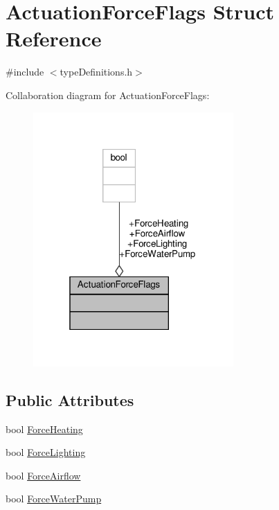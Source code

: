 \hypertarget{structActuationForceFlags}{}\section{Actuation\+Force\+Flags Struct Reference}
\label{structActuationForceFlags}


{\ttfamily \#include $<$type\+Definitions.\+h$>$}



Collaboration diagram for Actuation\+Force\+Flags\+:\nopagebreak
\begin{figure}[H]
\begin{center}
\leavevmode
\includegraphics[width=217pt]{structActuationForceFlags__coll__graph}
\end{center}
\end{figure}
\subsection*{Public Attributes}
\begin{DoxyCompactItemize}
\item 
bool \hyperlink{structActuationForceFlags_acfa5f3a1459c151992a2d783b79ea734}{Force\+Heating}
\item 
bool \hyperlink{structActuationForceFlags_a575df93310a4363147c99437d7b8061c}{Force\+Lighting}
\item 
bool \hyperlink{structActuationForceFlags_a6df34a4a82cc2b7297f8a1cbe2e073da}{Force\+Airflow}
\item 
bool \hyperlink{structActuationForceFlags_ab969137846bc6b38bbe3c204e8a4975e}{Force\+Water\+Pump}
\end{DoxyCompactItemize}


